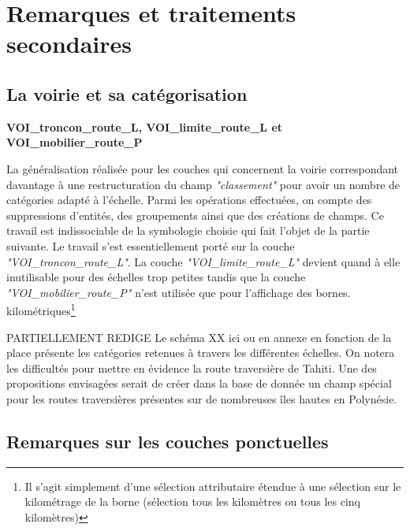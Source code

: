 \section{Remarques et traitements secondaires}
\subsection{La voirie et sa catégorisation}
\begin{center}
    \footnotesize
    \textbf{VOI\_troncon\_route\_L, VOI\_limite\_route\_L et VOI\_mobilier\_route\_P }
\end{center}
La généralisation réalisée pour les couches qui concernent la voirie correspondant davantage à une restructuration du champ \textit{"classement" }pour avoir un nombre de catégories adapté à l'échelle. Parmi les opérations effectuées, on compte des suppressions d'entités, des groupements ainsi que des créations de champs. Ce travail est indissociable de la symbologie choisie qui fait l'objet de la partie suivante. Le travail s'est essentiellement porté sur la couche \textit{"VOI\_troncon\_route\_L"}. La couche \textit{"VOI\_limite\_route\_L"} devient quand à elle inutilisable pour des échelles trop petites tandis que la couche \textit{"VOI\_mobilier\_route\_P"} n'est utilisée que pour l'affichage des bornes. kilométriques\footnote{Il s'agit simplement d'une sélection attributaire étendue à une sélection sur le kilométrage de la borne (sélection tous les kilomètres ou tous les cinq kilomètres)}

{\color{magenta}PARTIELLEMENT REDIGE Le schéma XX ici ou en annexe en fonction de la place présente les catégories retenues à travers les différentes échelles.} On notera les difficultés pour mettre en évidence la route traversière de Tahiti. Une des propositions envisagées serait de créer dans la base de donnée un champ spécial pour les routes traversières présentes sur de nombreuses îles hautes en Polynésie.


\subsection{Remarques sur les couches ponctuelles}

